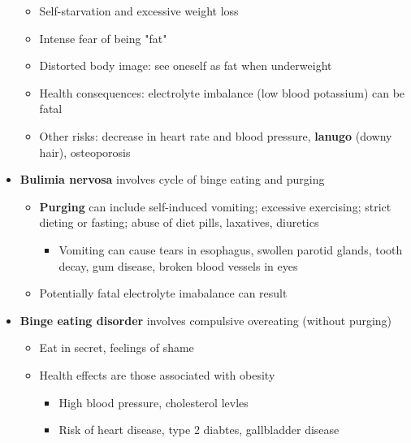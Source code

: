 \documentclass[12pt]{article}
\begin{document}
\begin{itemize}
                    \begin{itemize}
                        \item Self-starvation and excessive weight loss
                        \item Intense fear of being "fat"
                        \item Distorted body image: see oneself as fat when underweight
                        \item Health consequences: electrolyte imbalance (low blood potassium) can be fatal
                        \item Other risks: decrease in heart rate and blood pressure, \textbf{lanugo} (downy hair), osteoporosis
                    \end{itemize}
                \item \textbf{Bulimia nervosa} involves cycle of binge eating and purging
                    \begin{itemize}
                        \item \textbf{Purging} can include self-induced vomiting; excessive exercising; strict dieting or fasting; abuse of diet pills, laxatives, diuretics
                            \begin{itemize}
                                \item Vomiting can cause tears in esophagus, swollen parotid glands, tooth decay, gum disease, broken blood vessels in eyes
                            \end{itemize}
                        \item Potentially fatal electrolyte imabalance can result
                    \end{itemize}
                \item \textbf{Binge eating disorder} involves compulsive overeating (without purging)
                    \begin{itemize}
                        \item Eat in secret, feelings of shame
                        \item Health effects are those associated with obesity
                            \begin{itemize}
                                \item High blood pressure, cholesterol levles
                                \item Risk of heart disease, type 2 diabtes, gallbladder disease
                            \end{itemize}

\end{itemize}
\end{itemize}
\end{document}

